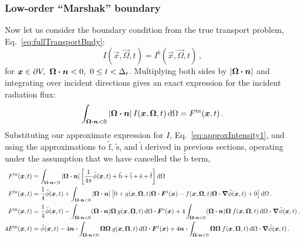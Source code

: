 \subsubsection{Low-order ``Marshak'' boundary}
Now let us consider the boundary condition from the true transport problem,
Eq.~\eqref{eq:fullTransportBndy}:
\begin{equation*}
  I(\vec{x}, \vec{\Omega}, t)
  = I^b(\vec{x}, \vec{\Omega}, t) \,,
\end{equation*}
for $\bm{x} \in \partial V, \ \bm{\Omega} \bm{\cdot} \bm{n} < 0,
 \ 0 \le t < \Delta_t$.
 Multiplying both sides by $\left| \bm{\Omega} \bm{\cdot} \bm{n} \right|$ and
 integrating over incident directions gives an exact expression for the
 incident radiation flux:
\begin{equation*}
 \int_{\bm{\Omega} \bm{\cdot} \bm{n} < 0} \left| \bm{\Omega} \bm{\cdot} \bm{n} \right|
 I(\bm{x}, \bm{\Omega}, t) \mathop{}\!\mathrm{d}\Omega
 = F^\mathrm{in}(\bm{x}, t)\,.
\end{equation*}
Substituting our approximate expression for $I$,
Eq.~\eqref{eq:approxIntensity1}, and using the approximations to
$\mathrm{ \tilde f }$, $\mathrm{ \tilde s }$, and $\mathrm{ \tilde i }$ derived
in previous sections, operating under the assumption that we have cancelled the
$\mathrm{ \tilde b }$ term,
\begin{align}\nonumber
  F^\mathrm{in}(\bm{x}, t)
  &= \int_{\bm{\Omega} \bm{\cdot} \bm{n} < 0} \left| \bm{\Omega} \bm{\cdot} \bm{n} \right|
 \left[
   \frac1{4\pi} \tilde \phi(\bm{x}, t) 
  + \mathrm{ \tilde b }
  + \mathrm{ \tilde i }
  + \mathrm{ \tilde s }
  + \mathrm{ \tilde f }\right]\mathop{}\!\mathrm{d}\Omega
 \\\nonumber
  F^\mathrm{in}(\bm{x}, t)
 &=
 \frac1{4} \tilde \phi(\bm{x}, t) 
 + \int_{\bm{\Omega} \bm{\cdot} \bm{n} < 0} \left| \bm{\Omega} \bm{\cdot} \bm{n} \right|
\left[
 0
  + g(\bm{x}, \bm{\Omega}, t) \bm{\Omega} \bm{\cdot} \bm{F}^i(\bm{x})
  - f(\bm{x}, \bm{\Omega}, t) \bm{\Omega} \bm{\cdot} \bm{\nabla} \tilde\phi(\bm{x}, t)
  + 0 \right]\mathop{}\!\mathrm{d}\Omega\,.
\\ \nonumber
 F^\mathrm{in}(\bm{x}, t)
 &=
 \frac1{4} \tilde \phi(\bm{x}, t) 
 - \int_{\bm{\Omega} \bm{\cdot} \bm{n} < 0} (\bm{\Omega} \bm{\cdot} \bm{n})
 \bm{\Omega}\:
 g(\bm{x}, \bm{\Omega}, t) \mathop{}\!\mathrm{d}\Omega \bm{\cdot} \bm{F}^i(\bm{x})
 + 4\int_{\bm{\Omega} \bm{\cdot} \bm{n} < 0} (\bm{\Omega} \bm{\cdot} \bm{n})
 \bm{\Omega}\:
 f(\bm{x}, \bm{\Omega}, t) \mathop{}\!\mathrm{d}\Omega \bm{\cdot} \bm{\nabla} \tilde\phi(\bm{x}, t)
\,.
\\ \label{eq:bndyAnisotropic}
 4F^\mathrm{in}(\bm{x}, t)
 &=
 \tilde \phi(\bm{x}, t) 
 - 4 \bm{n} \bm{\cdot} \int_{\bm{\Omega} \bm{\cdot} \bm{n} < 0}
 \bm{\Omega} \bm{\Omega}\:
 g(\bm{x}, \bm{\Omega}, t) \mathop{}\!\mathrm{d}\Omega \bm{\cdot} \bm{F}^i(\bm{x})
 + 4 \bm{n} \bm{\cdot} \int_{\bm{\Omega} \bm{\cdot} \bm{n} < 0}
 \bm{\Omega} \bm{\Omega}\:
 f(\bm{x}, \bm{\Omega}, t) \mathop{}\!\mathrm{d}\Omega \bm{\cdot} \bm{\nabla} \tilde\phi(\bm{x}, t)
\,.
\end{align}


